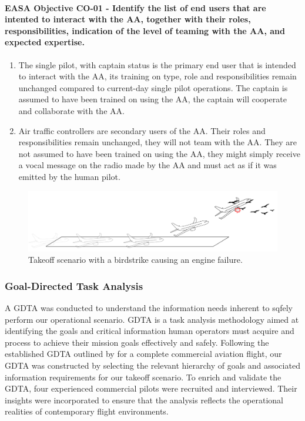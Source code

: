 \documentclass[12pt,a4paper]{article} %
\begin{document}
	\paragraph{EASA Objective CO-01 - Identify the list of end users that are intented to interact with the AA, together with their roles, responsibilities, indication of the level of teaming with the AA, and expected expertise.}
	\begin{enumerate}
		\item The single pilot, with captain status is the primary end user that is intended to interact with the AA, its training on type, role and responsibilities remain unchanged compared to current-day single pilot operations. The captain is assumed to have been trained on using the AA, the captain will cooperate and collaborate with the AA.
		\item Air traffic controllers are secondary users of the AA. Their roles and responsibilities remain unchanged, they will not team with the AA. They are not assumed to have been trained on using the AA, they might simply receive a vocal message on the radio made by the AA and must act as if it was emitted by the human pilot. 
	\end{enumerate}
	
	\begin{figure}[H]
 		\centering
  		\includegraphics[width=1\textwidth]{./images/scenario.png}
   		\caption{Takeoff scenario with a birdstrike causing an engine failure.}
		\label{fig:takeoff-scenario-simplified}
	\end{figure}

	\subsubsection{Goal-Directed Task Analysis}
	A GDTA was conducted to understand the information needs inherent to sqfely perform our operational scenario. GDTA is a task analysis methodology aimed at identifying the goals and critical information human operators must acquire and process to achieve their mission goals effectively and safely.
	Following the established GDTA outlined by \textcite{endsley_designing_2003} for a complete commercial aviation flight, our GDTA was constructed by selecting the relevant hierarchy of goals and associated information requirements for our takeoff scenario. To enrich and validate the GDTA, four experienced commercial pilots were recruited and interviewed. Their insights were incorporated to ensure that the analysis reflects the operational realities of contemporary flight environments.
\end{document}
